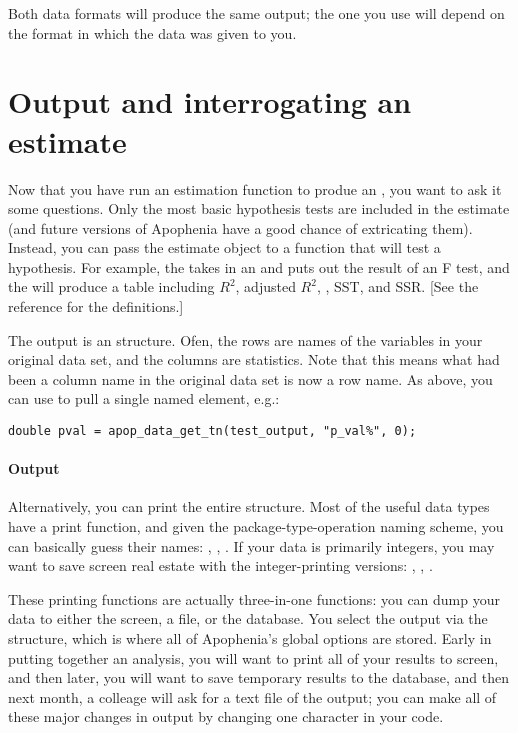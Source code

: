 Both data formats will produce the same output; the one you use will
depend on the format in which the data was given to you.




\section{Output and interrogating an estimate}  \label{testoutput}
Now that you have run an estimation function to produe an 
, you want to ask it some questions. Only the most
basic hypothesis tests are included in the estimate (and future versions
of Apophenia have a good chance of extricating them). Instead, you can
pass the estimate object to a function that will test a hypothesis. For
example, the  takes in an 
 and puts out the result of an F test, and the
 will produce a
table including $R^2$, adjusted $R^2$, , SST, and SSR. [See the
reference for the definitions.] 

The output is an  structure. Ofen, the rows are
names of the variables in your original data set, and the columns are
statistics. Note that this means what had been a column name in the 
original data set is now a row name. As above, you can use 
 to pull a single named element, e.g.:
\begin{lstlisting}
double pval = apop_data_get_tn(test_output, "p_val%", 0);
\end{lstlisting}

\paragraph{Output} 
Alternatively, you can print the entire   structure.
Most of the useful data types have
a print function, and given the package-type-operation naming scheme,
you can basically guess their names: ,
, . If your
data is primarily integers, you may want to save screen real estate
with the integer-printing versions: ,
, .

These printing functions are actually three-in-one functions: you can
dump your data to either the screen, a file, or the database. You select
the output via the  structure, which is where all of
Apophenia's global options are stored. Early in putting together an
analysis, you will want to print all of your results to screen, and then
later, you will want to save temporary results to the database, and then
next month, a colleage will ask for a text file of the output; you can
make all of these major changes in output by changing 
one character in your code.

